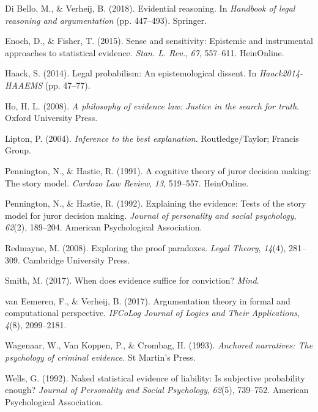 \documentclass[11pt,dvipsnames,enabledeprecatedfontcommands]{scrartcl}
\begin{document}
\hypertarget{ref-di2018evidential}{}
Di Bello, M., \& Verheij, B. (2018). Evidential reasoning. In
\emph{Handbook of legal reasoning and argumentation} (pp. 447--493).
Springer.

\hypertarget{ref-enoch2015sense}{}
Enoch, D., \& Fisher, T. (2015). Sense and sensitivity: Epistemic and
instrumental approaches to statistical evidence. \emph{Stan. L. Rev.},
\emph{67}, 557--611. HeinOnline.

\hypertarget{ref-haack2011legal}{}
Haack, S. (2014). Legal probabilism: An epistemological dissent. In
\emph{Haack2014-HAAEMS} (pp. 47--77).

\hypertarget{ref-ho2008philosophy}{}
Ho, H. L. (2008). \emph{A philosophy of evidence law: Justice in the
search for truth}. Oxford University Press.

\hypertarget{ref-Lipton2004-LIPITT}{}
Lipton, P. (2004). \emph{Inference to the best explanation}.
Routledge/Taylor; Francis Group.

\hypertarget{ref-pennington1991cognitive}{}
Pennington, N., \& Hastie, R. (1991). A cognitive theory of juror
decision making: The story model. \emph{Cardozo Law Review}, \emph{13},
519--557. HeinOnline.

\hypertarget{ref-pennington1992explaining}{}
Pennington, N., \& Hastie, R. (1992). Explaining the evidence: Tests of
the story model for juror decision making. \emph{Journal of personality
and social psychology}, \emph{62}(2), 189--204. American Psychological
Association.

\hypertarget{ref-redmayne2008exploring}{}
Redmayne, M. (2008). Exploring the proof paradoxes. \emph{Legal Theory},
\emph{14}(4), 281--309. Cambridge University Press.

\hypertarget{ref-Smith_conviction_mind_2017}{}
Smith, M. (2017). When does evidence suffice for conviction?
\emph{Mind}.

\hypertarget{ref-vanEemeren2017}{}
van Eemeren, F., \& Verheij, B. (2017). Argumentation theory in formal
and computational perspective. \emph{IFCoLog Journal of Logics and Their
Applications}, \emph{4}(8), 2099--2181.

\hypertarget{ref-wagenaar1993anchored}{}
Wagenaar, W., Van Koppen, P., \& Crombag, H. (1993). \emph{Anchored
narratives: The psychology of criminal evidence.} St Martin's Press.

\hypertarget{ref-wells1992naked}{}
Wells, G. (1992). Naked statistical evidence of liability: Is subjective
probability enough? \emph{Journal of Personality and Social Psychology},
\emph{62}(5), 739--752. American Psychological Association.
\end{document}
